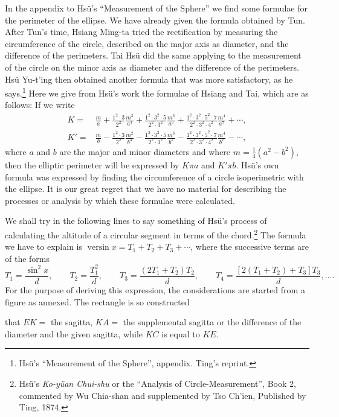 \documentclass[11pt]{article}
\newcommand{\scanpage}[2]{\clearpage\setcounter{footnote}{0}\noindent{\footnotesize\color{gray}PDF page #1 · #2}\par\medskip}
\newcommand{\scanfooter}{}
\newcommand{\versin}{\mathop{\mathrm{versin}}}
\begin{document}
In the appendix to Hsü's ``Measurement of the Sphere'' we find some formulae for the perimeter of the ellipse. We have already given the formula obtained by Tun. After Tun's time, Hsiang Ming-ta tried the rectification by measuring the circumference of the circle, described on the major axis as diameter, and the difference of the perimeters. Tai Hsü did the same applying to the measurement of the circle on the minor axis as diameter and the difference of the perimeters. Hsü Yu-t'ing then obtained another formula that was more satisfactory, as he says.\footnote{Hsü's ``Measurement of the Sphere'', appendix. Ting's reprint.} Here we give from Hsü's work the formulae of Hsiang and Tai, which are as follows: If we write
\[
\begin{aligned}
K={}&\frac{m}{a}+\frac{1^2\cdot3}{2^2}\frac{m^2}{a^3}
+\frac{1^2\cdot3^2\cdot5}{2^2\cdot3^2}\frac{m^3}{a^5}
+\frac{1^2\cdot3^2\cdot5^2\cdot7}{2^2\cdot3^2\cdot4^2}\frac{m^4}{a^7}+\cdots,\\
K'={}&\frac{m}{b}-\frac{1^2\cdot3}{2^2}\frac{m^2}{b^3}
-\frac{1^2\cdot3^2\cdot5}{2^2\cdot3^2}\frac{m^3}{b^5}
-\frac{1^2\cdot3^2\cdot5^2\cdot7}{2^2\cdot3^2\cdot4^2}\frac{m^4}{b^7}-\cdots,
\end{aligned}
\]
where $a$ and $b$ are the major and minor diameters and where $m=\frac14(a^2-b^2)$, then the elliptic perimeter will be expressed by $K\pi a$ and $K'\pi b$. Hsü's own formula was expressed by finding the circumference of a circle isoperimetric with the ellipse. It is our great regret that we have no material for describing the processes or analysis by which these formulae were calculated.

We shall try in the following lines to say something of Hsü's process of calculating the altitude of a circular segment in terms of the chord.\footnote{Hsü's \emph{Ko-yüan Chui-shu} or the ``Analysis of Circle-Measurement'', Book 2, commented by Wu Chia-shan and supplemented by Tso Ch'ien, Published by Ting, 1874.} The formula we have to explain is $\versin x=T_1+T_2+T_3+\cdots$, where the successive terms are of the forms
\[
T_1=\frac{\sin^2x}{d},\qquad
T_2=\frac{T_1^2}{d},\qquad
T_3=\frac{(2T_1+T_2)T_2}{d},\qquad
T_4=\frac{[2(T_1+T_2)+T_3]T_3}{d},\ldots.
\]
For the purpose of deriving this expression, the considerations are started from a figure as annexed. The rectangle is so constructed
\scanfooter

\scanpage{0168}{Chapter 21, printed page 154}
that $EK=$ the sagitta, $KA=$ the supplemental sagitta or the difference of the diameter and the given sagitta, while $KC$ is equal to $KE$.
\end{document}
